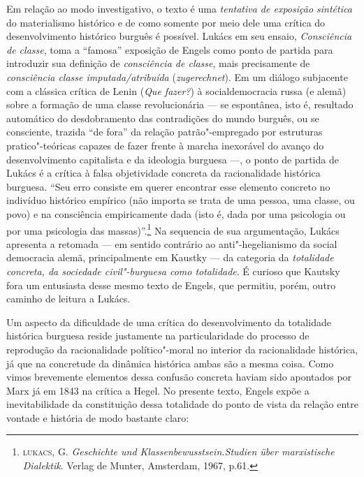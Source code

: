 Em relação ao modo investigativo, o texto é uma \emph{tentativa de
exposição sintética} do materialismo histórico e de como somente por
meio dele uma crítica do desenvolvimento histórico burguês é possível.
Lukács em seu ensaio, \emph{Consciência de classe}, toma a ``famosa''
exposição de Engels como ponto de partida para introduzir sua definição
de \emph{consciência de classe}, mais precisamente de \emph{consciência
classe imputada/atribuída} (\emph{zugerechnet}). Em um diálogo
subjacente com a clássica crítica de Lenin (\emph{Que fazer?}) à
socialdemocracia russa (e alemã) sobre a formação de uma classe
revolucionária --- se espontânea, isto é, resultado automático do
desdobramento das contradições do mundo burguês, ou se consciente,
trazida ``de fora'' da relação patrão"-empregado por estruturas
pratico"-teóricas capazes de fazer frente à marcha inexorável do avanço
do desenvolvimento capitalista e da ideologia burguesa ---, o ponto de
partida de Lukács é a crítica à falsa objetividade concreta da
racionalidade histórica burguesa. ``Seu erro consiste em querer
encontrar esse elemento concreto no indivíduo histórico empírico (não
importa se trata de uma pessoa, uma classe, ou povo) e na consciência
empiricamente dada (isto é, dada por uma psicologia ou por uma
psicologia das massas)''.\footnote{\textsc{lukacs}, G. \emph{Geschichte
  und Klassenbewusstsein.Studien über marxistische Dialektik}. Verlag de
  Munter, Amsterdam, 1967, p.61.} Na sequencia de sua argumentação,
Lukács apresenta a retomada --- em sentido contrário ao
anti"-hegelianismo da social democracia alemã, principalmente em Kaustky
--- da categoria da \emph{totalidade concreta, da sociedade
civil"-burguesa como totalidade}. É curioso que Kautsky fora um
entusiasta desse mesmo texto de Engels, que permitiu, porém, outro
caminho de leitura a Lukács.

Um aspecto da dificuldade de uma crítica do desenvolvimento da
totalidade histórica burguesa reside justamente na particularidade do
processo de reprodução da racionalidade político"-moral no interior da
racionalidade histórica, já que na concretude da dinâmica histórica
ambas são a mesma coisa. Como vimos brevemente elementos dessa confusão
concreta haviam sido apontados por Marx já em 1843 na crítica a Hegel.
No presente texto, Engels expõe a inevitabilidade da constituição dessa
totalidade do ponto de vista da relação entre vontade e história de modo
bastante claro:

